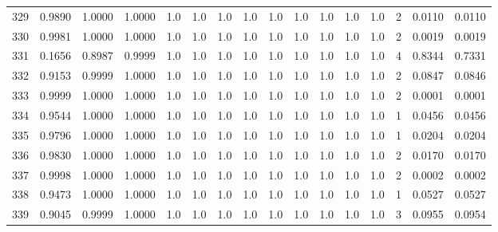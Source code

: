 \begin{tabular}{lrrrrrrrrrrrrrrr}
329 &      0.9890 &  1.0000 &  1.0000 &     1.0 &     1.0 &     1.0 &     1.0 &     1.0 &     1.0 &     1.0 &      1.0 &        1.0 &      2 &                    0.0110 &                     0.0110 \\
330 &      0.9981 &  1.0000 &  1.0000 &     1.0 &     1.0 &     1.0 &     1.0 &     1.0 &     1.0 &     1.0 &      1.0 &        1.0 &      2 &                    0.0019 &                     0.0019 \\
331 &      0.1656 &  0.8987 &  0.9999 &     1.0 &     1.0 &     1.0 &     1.0 &     1.0 &     1.0 &     1.0 &      1.0 &        1.0 &      4 &                    0.8344 &                     0.7331 \\
332 &      0.9153 &  0.9999 &  1.0000 &     1.0 &     1.0 &     1.0 &     1.0 &     1.0 &     1.0 &     1.0 &      1.0 &        1.0 &      2 &                    0.0847 &                     0.0846 \\
333 &      0.9999 &  1.0000 &  1.0000 &     1.0 &     1.0 &     1.0 &     1.0 &     1.0 &     1.0 &     1.0 &      1.0 &        1.0 &      2 &                    0.0001 &                     0.0001 \\
334 &      0.9544 &  1.0000 &  1.0000 &     1.0 &     1.0 &     1.0 &     1.0 &     1.0 &     1.0 &     1.0 &      1.0 &        1.0 &      1 &                    0.0456 &                     0.0456 \\
335 &      0.9796 &  1.0000 &  1.0000 &     1.0 &     1.0 &     1.0 &     1.0 &     1.0 &     1.0 &     1.0 &      1.0 &        1.0 &      1 &                    0.0204 &                     0.0204 \\
336 &      0.9830 &  1.0000 &  1.0000 &     1.0 &     1.0 &     1.0 &     1.0 &     1.0 &     1.0 &     1.0 &      1.0 &        1.0 &      2 &                    0.0170 &                     0.0170 \\
337 &      0.9998 &  1.0000 &  1.0000 &     1.0 &     1.0 &     1.0 &     1.0 &     1.0 &     1.0 &     1.0 &      1.0 &        1.0 &      2 &                    0.0002 &                     0.0002 \\
338 &      0.9473 &  1.0000 &  1.0000 &     1.0 &     1.0 &     1.0 &     1.0 &     1.0 &     1.0 &     1.0 &      1.0 &        1.0 &      1 &                    0.0527 &                     0.0527 \\
339 &      0.9045 &  0.9999 &  1.0000 &     1.0 &     1.0 &     1.0 &     1.0 &     1.0 &     1.0 &     1.0 &      1.0 &        1.0 &      3 &                    0.0955 &                     0.0954 \\

\end{tabular}
